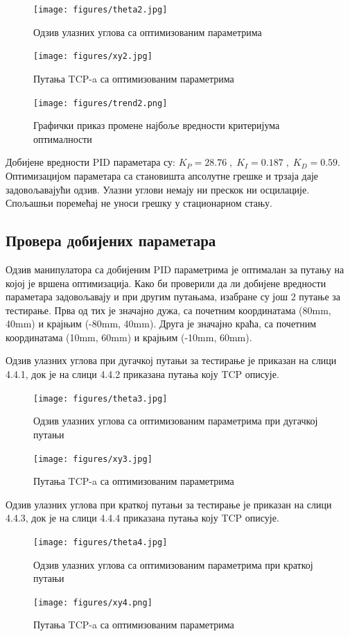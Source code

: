 \documentclass[12pt]{article}
\begin{document}
\begin{figure}[H]
    \centering
    \texttt{[image: figures/theta2.jpg]}
    \caption{Одзив улазних углова са оптимизованим параметрима}
    \label{fig:theta2}
\end{figure}
\begin{figure}[H]
    \centering
    \texttt{[image: figures/xy2.jpg]}
    \caption{Путања TCP-a са оптимизованим параметрима}
    \label{fig:xy2}
\end{figure}
\begin{figure}[H]
    \centering
    \texttt{[image: figures/trend2.png]}
    \caption{Графички приказ промене најбоље вредности критеријума оптималности}
    \label{fig:trend_2}
\end{figure}
Добијене вредности PID параметара су: $K_P=28.76\;,\;K_I=0.187\;,\;K_D=0.59$. Оптимизацијом параметара са становишта апсолутне грешке и трзаја даје задовољавајући одзив. Улазни углови немају ни прескок ни осцилације. Спољашњи поремећај не уноси грешку у стационарном стању. 

\subsection{Провера добијених параметара}
Одзив манипулатора са добијеним PID параметрима је оптималан за путању на којој је вршена оптимизација.
Како би проверили да ли добијене вредности параметара задовољавају и при другим путањама, изабране су још 2 путање за тестирање. Прва од тих је значајно дужа, са почетним координатама (80mm, 40mm) и крајњим (-80mm, 40mm). Друга је значајно краћа,  са почетним координатама (10mm, 60mm) и крајњим (-10mm, 60mm).

Одзив улазних углова при дугачкој путањи за тестирање је приказан на слици 4.4.1, док је на слици 4.4.2 приказана путања коју TCP описује.
\begin{figure}[H]
    \centering
    \texttt{[image: figures/theta3.jpg]}
    \caption{Одзив улазних углова са оптимизованим параметрима при дугачкој путањи}
    \label{fig:theta3}
\end{figure}
\begin{figure}[H]
    \centering
    \texttt{[image: figures/xy3.jpg]}
    \caption{Путања TCP-a са оптимизованим параметрима}
    \label{fig:xy_3}
\end{figure}
Одзив улазних углова при краткој путањи за тестирање је приказан на слици 4.4.3, док је на слици 4.4.4 приказана путања коју TCP описује.
\begin{figure}[H]
    \centering
    \texttt{[image: figures/theta4.jpg]}
    \caption{Одзив улазних углова са оптимизованим параметрима при краткој путањи}
    \label{fig:theta_short}
\end{figure}
\begin{figure}[H]
    \centering
    \texttt{[image: figures/xy4.png]}
    \caption{Путања TCP-a са оптимизованим параметрима}
    \label{fig:xy_short}
\end{figure}
\end{document}
